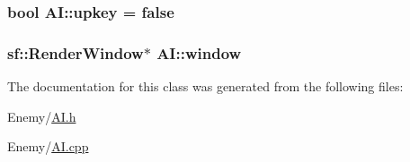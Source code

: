 \subsubsection[{\texorpdfstring{upkey}{upkey}}]{\setlength{\rightskip}{0pt plus 5cm}bool A\+I\+::upkey = false\hspace{0.3cm}{\ttfamily [protected]}}\hypertarget{classAI_a1bde8ebcfb666d83ffb7e71993bf06fc}{}\label{classAI_a1bde8ebcfb666d83ffb7e71993bf06fc}
\subsubsection[{\texorpdfstring{window}{window}}]{\setlength{\rightskip}{0pt plus 5cm}sf\+::\+Render\+Window$\ast$ A\+I\+::window\hspace{0.3cm}{\ttfamily [protected]}}\hypertarget{classAI_a0484a23ffd7e5c09b7fc252350a2c8c4}{}\label{classAI_a0484a23ffd7e5c09b7fc252350a2c8c4}


The documentation for this class was generated from the following files\+:\begin{DoxyCompactItemize}
\item 
Enemy/\hyperlink{AI_8h}{A\+I.\+h}\item 
Enemy/\hyperlink{AI_8cpp}{A\+I.\+cpp}\end{DoxyCompactItemize}

